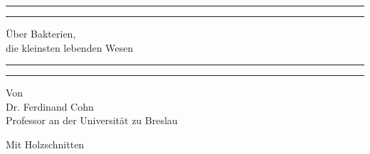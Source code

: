 \documentclass[a4paper, 11pt, oneside, english]{article}
\begin{document}
\begin{titlepage} %
	\centering %
	\scshape %

	
	\rule{\textwidth}{1.6pt}\vspace*{-\baselineskip}\vspace*{2pt} %
	\rule{\textwidth}{0.4pt} %
	
	\vspace{0.75\baselineskip} %

        {\LARGE Über Bakterien, \\\large die kleinsten lebenden Wesen} %
	
	\vspace{0.75\baselineskip} %
	
	\rule{\textwidth}{0.4pt}\vspace*{-\baselineskip}\vspace{3.2pt} %
	\rule{\textwidth}{1.6pt} %
	
	\vspace{1\baselineskip} %
	
	
	{Von \\\Large Dr. Ferdinand Cohn\\\large Professor an der Universität zu Breslau} %
	
	\vspace*{1\baselineskip} %

        {\normalsize Mit Holzschnitten}

         \vspace*{1\baselineskip} %

	
		
		

\end{titlepage}
\end{document}

